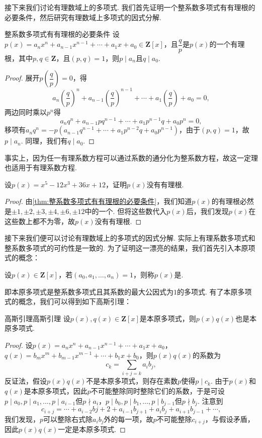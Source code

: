 接下来我们讨论有理数域上的多项式. 我们首先证明一个整系数多项式有有理根的必要条件，然后研究有理数域上多项式的因式分解.
\begin{theorem}{}{整系数多项式有有理根的必要条件}
    设$p(x)=a_nx^n+a_{n-1}x^{n-1}+\cdots+a_1x+a_0\in\mathbf{Z}[x]$，且$\dfrac{q}{p}$是$p(x)$的一个有理根，其中$p,q\in\mathbf{Z}$，且$(p,q)=1$，则$p\mid a_n$且$q\mid a_0$.
\end{theorem}
\begin{proof}
    展开$p\left(\dfrac{q}{p}\right)=0$，得
    \[a_n\left(\dfrac{q}{p}\right)^n+a_{n-1}\left(\dfrac{q}{p}\right)^{n-1}+\cdots+a_1\left(\dfrac{q}{p}\right)+a_0=0,\]
    两边同时乘以$p^n$得
    \[a_nq^n+a_{n-1}pq^{n-1}+\cdots+a_1p^{n-1}q+a_0p^n=0,\]
    移项有$a_nq^n=-p(a_{n-1}q^{n-1}+\cdots+a_1p^{n-2}q+a_0p^{n-1})$，由于$(p,q)=1$，故$p\mid a_n$. 同理，我们有$q\mid a_0$.
\end{proof}

事实上，因为任一有理系数方程可以通过系数的通分化为整系数方程，故这一定理也适用于有理系数方程.
\begin{example}{}{}
    设$p(x)=x^5-12x^3+36x+12$，证明$p(x)$没有有理根.
\end{example}
\begin{proof}
    由\autoref{thm:整系数多项式有有理根的必要条件}，我们知道$p(x)$的有理根必然是$\pm 1,\pm 2,\pm 3,\pm 4,\pm 6,\pm 12$中的一个. 但将这些数代入$p(x)$后，我们发现$p(x)$在这些数上都不为零，故$p(x)$没有有理根.
\end{proof}

接下来我们便可以讨论有理数域上的多项式的因式分解. 实际上有理系数多项式和整系数多项式的可约性是一致的. 为了证明这一漂亮的结果，我们首先引入本原项式的概念：
\begin{definition}{}{}
    设$p(x)\in\mathbf{Z}[x]$，若$(a_0,a_1,\ldots,a_n)=1$，则称$p(x)$是.
\end{definition}
即本原多项式是整系数多项式且其系数的最大公因式为$1$的多项式. 有了本原多项式的概念，我们可以得到如下高斯引理：
\begin{lemma}{高斯引理}{高斯引理}
    设$p(x),q(x)\in\mathbf{Z}[x]$是本原多项式，则$p(x)q(x)$也是本原多项式.
\end{lemma}
\begin{proof}
    设$p(x)=a_nx^n+a_{n-1}x^{n-1}+\cdots+a_1x+a_0$，$q(x)=b_mx^m+b_{m-1}x^{m-1}+\cdots+b_1x+b_0$，则$p(x)q(x)$的系数为
    \[c_k=\sum_{i+j=k}a_ib_j,\]
    反证法，假设$p(x)q(x)$不是本原多项式，则存在素数$p$使得$p\mid c_k$. 由于$p(x)$和$q(x)$是本原多项式，因此$p$不可能整除同时整除它们的系数，于是可设$p\mid a_0,p\mid a_1,\ldots,p\mid a_{i-1}$但$p\nmid a_i$，$p\mid b_0,p\mid b_1,\ldots,p\mid b_{j-1}$但$p\nmid b_j$. 注意到
    \[c_{i+j}=\cdots+a_{i-2}b{j+2}+a_{i-1}b_{j+1}+a_ib_j+a_{i+1}b_{j-1}+\cdots,\]
    我们发现，$p$可以整除右式除$a_ib_j$外的每一项，故$p$不可能整除$c_{i+j}$，与假设矛盾，因此$p(x)q(x)$一定是本原多项式.
\end{proof}

